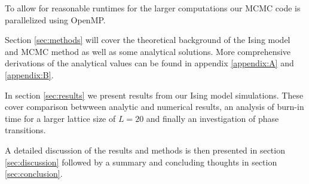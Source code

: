 \documentclass[english,notitlepage,reprint,nofootinbib]{revtex4-1}  %
\begin{document}
To allow for reasonable runtimes for the larger computations our MCMC code is parallelized using OpenMP.

Section \ref{sec:methods} will cover the theoretical background of the Ising model and MCMC method as well as some analytical solutions. More comprehensive derivations of the analytical values can be found in appendix \ref{appendix:A} and \ref{appendix:B}.

In section \ref{sec:results} we present results from our Ising model simulations. These cover comparison betwween analytic and numerical results, an analysis of burn-in time for a larger lattice size of $L = 20$ and finally an investigation of phase transitions.

A detailed discussion of the results and methods is then presented in section \ref{sec:discussion} followed by a summary and concluding thoughts in section \ref{sec:conclusion}.

\end{document}
